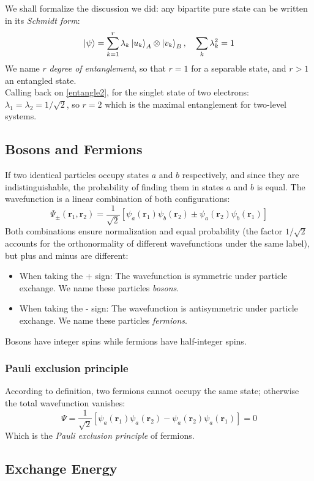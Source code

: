 We shall formalize the discussion we did: any bipartite pure state can be written in its \emph{Schmidt form}:
\[
\ket{\psi} = \sum_{k=1}^{r}\lambda_k\ket{u_k}_A\otimes\ket{v_k}_B,
\quad \sum_{k}\lambda_k^2=1
\]
We name $r$ \emph{degree of entanglement}, so that $r=1$ for a separable state, and $r>1$ an entangled state.\\
Calling back on \ref{entangle2}, for the singlet state of two electrons: $\lambda_1 = \lambda_2 = 1/\sqrt{2}$, so $r = 2$ which is the maximal entanglement for two-level systems.

\subsection{Bosons and Fermions}
If two identical particles occupy states $a$ and $b$ respectively, and since they are indistinguishable, the probability of finding them in states $a$ and $b$ is equal. The wavefunction is a linear combination of both configurations:
\[
    \Psi_{\pm}(\mathbf{r}_1, \mathbf{r}_2) = \frac{1}{\sqrt{2}}\left[\psi_a(\mathbf{r}_1)\psi_b(\mathbf{r}_2) \pm \psi_a(\mathbf{r}_2)\psi_b(\mathbf{r}_1)\right]
\]
Both combinations ensure normalization and equal probability (the factor $1/\sqrt{2}$ accounts for the orthonormality of different wavefunctions under the same label), but plus and minus are different:

\begin{itemize}
    \item When taking the + sign: The wavefunction is symmetric under particle exchange. We name these particles \emph{bosons}.
    \item When taking the - sign: The wavefunction is antisymmetric under particle exchange. We name these particles \emph{fermions}.
\end{itemize}
Bosons have integer spins while fermions have half-integer spins.

\subsubsection{Pauli exclusion principle}\label{pauli}

According to definition, two fermions cannot occupy the same state; otherwise the total wavefunction vanishes:
\[
    \Psi = \frac{1}{\sqrt{2}}\left[\psi_a(\mathbf{r}_1)\psi_a(\mathbf{r}_2) - \psi_a(\mathbf{r}_2)\psi_a(\mathbf{r}_1)\right] = 0
\]
Which is the \emph{Pauli exclusion principle} of fermions.

\subsection{Exchange Energy}

